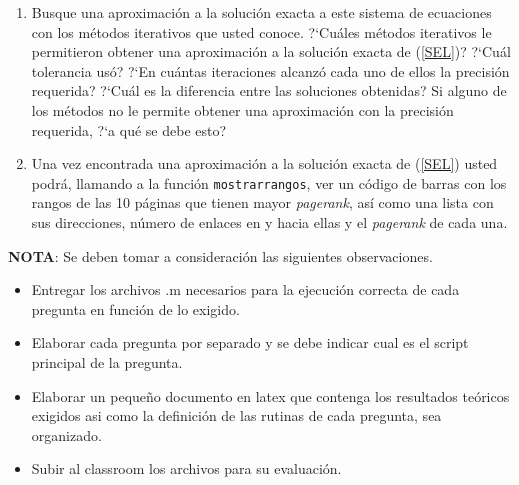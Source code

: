\documentclass[12pt,letterpaper]{article}
\begin{document}
\begin{enumerate}
\begin{enumerate}
\item Busque una aproximaci\'on a la soluci\'on exacta a este sistema de ecuaciones con los m\'etodos iterativos que usted conoce.
?`Cu\'ales m\'etodos iterativos le permitieron obtener una aproximaci\'on a la soluci\'on exacta de (\ref{SEL})? ?`Cu\'al tolerancia us\'o?
?`En cu\'antas iteraciones alcanz\'o cada uno de ellos la precisi\'on requerida? ?`Cu\'al es la diferencia entre las soluciones obtenidas?
Si alguno de los m\'etodos no le permite obtener una aproximaci\'on con la precisi\'on requerida, ?`a qu\'e se debe esto?

\item Una vez encontrada una aproximaci\'on a la soluci\'on exacta de (\ref{SEL}) usted podr\'a, llamando a la funci\'on
\texttt{mostrarrangos}, ver un c\'odigo de barras con los rangos de las 10 p\'aginas que tienen mayor \textit{pagerank}, as\'i como una
lista con sus direcciones, n\'umero de enlaces en y hacia ellas y el \textit{pagerank} de cada una.
\end{enumerate}

\end{enumerate}

\textbf{NOTA}: Se deben tomar a consideraci\'on las siguientes observaciones.
\begin{itemize}
  \item Entregar los archivos .m necesarios para la ejecuci\'on correcta de cada pregunta en funci\'on de lo exigido.
\item Elaborar cada pregunta por separado y se debe indicar cual es el script principal de la pregunta.
\item Elaborar un peque\~no documento en latex que contenga los resultados te\'oricos exigidos asi como la definici\'on de las rutinas de cada pregunta, sea organizado.
\item Subir al classroom los archivos para su evaluaci\'on.
\end{itemize}
\end{document}
